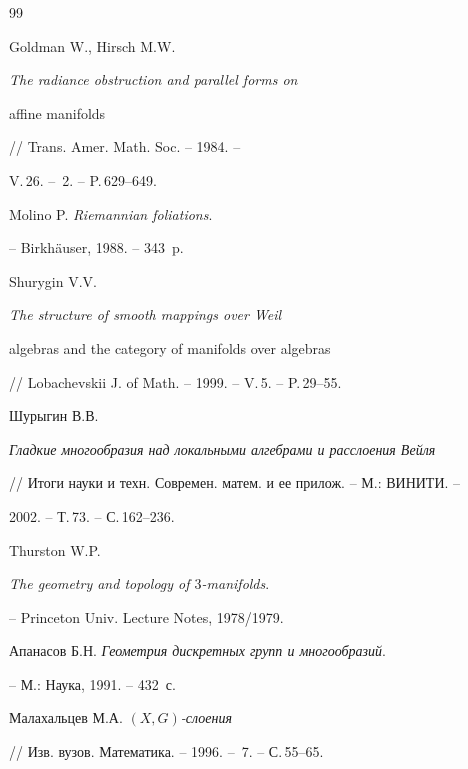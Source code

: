 \begin{thebibliography}{99}


Goldman W., Hirsch M.W.


{\it The radiance obstruction and parallel forms on


affine manifolds} // Trans. Amer. Math. Soc. -- 1984. -- 


V.\,26. -- \No\,2. -- P.\,629--649.







Molino P. {\it Riemannian foliations}.


-- Birkh\"auser, 1988. -- 343~p.







Shurygin V.V.


{\it The structure of smooth mappings over Weil


algebras and the category of manifolds over algebras}


// Lobachevskii J. of Math. -- 1999. -- V.\,5. -- P.\,29--55.







Шурыгин В.В.


{\it Гладкие многообразия над локальными алгебрами и расслоения Вейля}


// Итоги науки и техн. Современ. матем. и ее прилож. -- М.: ВИНИТИ. --


2002. -- Т.\,73. -- С.\,162--236.







Thurston W.P.


{\it The geometry and topology of $3$-manifolds}.


-- Princeton Univ. Lecture Notes, 1978/1979.







Апанасов Б.Н. {\it Геометрия дискретных групп и многообразий}.


-- М.: Наука, 1991. -- 432~с.







Малахальцев М.А. {\it $(X,G)$-слоения}


// Изв. вузов. Математика. -- 1996. -- \No\,7. -- С.\,55--65.






\end{thebibliography}
